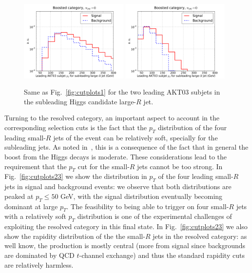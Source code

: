 \begin{figure}[t]
\begin{center}
 \includegraphics[width=0.48\textwidth]{plots/pt_leadSJ_fj2_noPU.pdf}
 \includegraphics[width=0.48\textwidth]{plots/pt_subleadSJ_fj2_noPU.pdf}
 \caption{\small  Same as Fig.~\ref{fig:cutplots1} for the two leading AKT03
   subjets in the subleading Higgs candidate large-$R$ jet.
}
\label{fig:cutplots22}
\end{center}
\end{figure}


Turning to the resolved category, an important aspect to account
in the corresponding selection
cuts is the fact that the $p_T$ distribution
of the four leading small-$R$ jets of the event can be relatively soft,
specially for the subleading jets.
%
As noted in~\cite{deLima:2014dta}, this is a consequence of the fact
that in general the boost from the Higgs decays is moderate.
%
These considerations lead to the requirement that the $p_T$ cut
for the small-$R$ jets cannot be too strong.
%
In Fig.~\ref{fig:cutplots23}
we show the distribution in $p_T$ of the four leading
small-$R$ jets in signal and background events: we observe that both
distributions are peaked at $p_T \le 50$ GeV, with the signal distribution
eventually becoming dominant at large $p_T$.
%
The feasibility to being able to trigger on four small-$R$ jets with a relatively
soft $p_T$ distribution is one of the experimental challenges of
exploiting the resolved category in this final state.
%
In  Fig.~\ref{fig:cutplots23} we also show the
rapidity distribution of the the small-$R$
jets in the resolved category: as well know, the production
is mostly central (more from signal since backgrounds are dominated by
QCD $t$-channel exchange) and thus the standard rapidity cuts
are relatively harmless.



